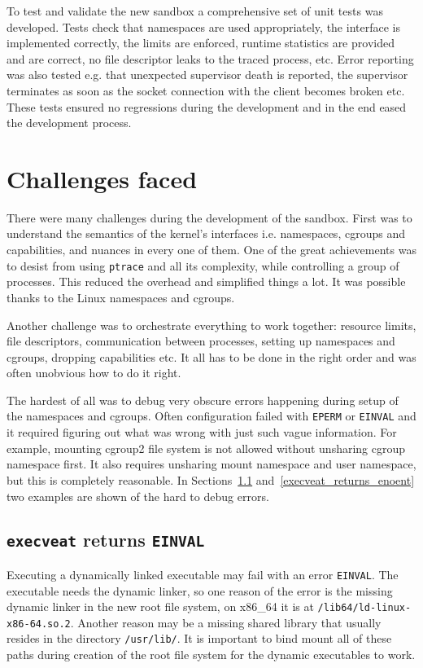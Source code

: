 \documentclass[en]{pracamgr}
\begin{document}
To test and validate the new sandbox a comprehensive set of unit tests was developed. Tests check that namespaces are used appropriately, the interface is implemented correctly, the limits are enforced, runtime statistics are provided and are correct, no file descriptor leaks to the traced process, etc. Error reporting was also tested e.g. that unexpected supervisor death is reported, the supervisor terminates as soon as the socket connection with the client becomes broken etc. These tests ensured no regressions during the development and in the end eased the development process.

\section{Challenges faced}

There were many challenges during the development of the sandbox. First was to understand the semantics of the kernel's interfaces i.e. namespaces, cgroups and capabilities, and nuances in every one of them. One of the great achievements was to desist from using \texttt{ptrace} and all its complexity, while controlling a group of processes. This reduced the overhead and simplified things a lot. It was possible thanks to the Linux namespaces and cgroups.

Another challenge was to orchestrate everything to work together: resource limits, file descriptors, communication between processes, setting up namespaces and cgroups, dropping capabilities etc. It all has to be done in the right order and was often unobvious how to do it right.

The hardest of all was to debug very obscure errors happening during setup of the namespaces and cgroups. Often configuration failed with \texttt{EPERM} or \texttt{EINVAL} and it required figuring out what was wrong with just such vague information. For example, mounting cgroup2 file system is not allowed without unsharing cgroup namespace first. It also requires unsharing mount namespace and user namespace, but this is completely reasonable. In Sections~\ref{execveat_returns_einval} and~\ref{execveat_returns_enoent} two examples are shown of the hard to debug errors.

\subsection{\texttt{execveat} returns \texttt{EINVAL}} \label{execveat_returns_einval}

Executing a dynamically linked executable may fail with an error \texttt{EINVAL}. The executable needs the dynamic linker, so one reason of the error is the missing dynamic linker in the new root file system, on x86\_64 it is at \texttt{/lib64/ld-linux-x86-64.so.2}. Another reason may be a missing shared library that usually resides in the directory \texttt{/usr/lib/}. It is important to bind mount all of these paths during creation of the root file system for the dynamic executables to work.
\end{document}
